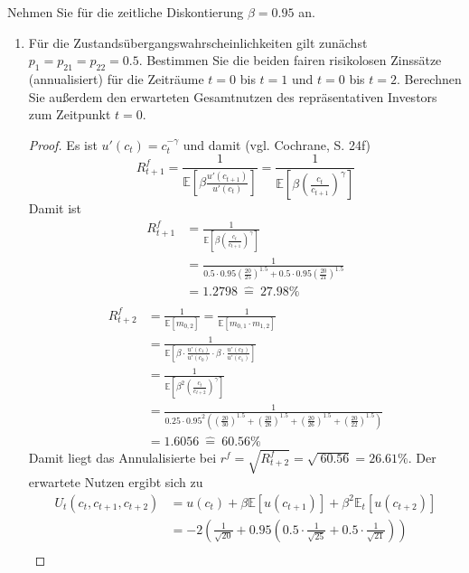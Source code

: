 \documentclass[12pt]{extreport} %
\theoremstyle{named}
\theoremstyle{nnamed}
\theoremstyle{itshape}
\theoremstyle{normal}
\begin{document}
Nehmen Sie für die zeitliche Diskontierung $\beta = 0.95$ an.
\begin{enumerate}
	\item Für die Zustandsübergangswahrscheinlichkeiten gilt zunächst $p_1 = p_{21} = p_{22} = 0.5$. Bestimmen Sie die beiden fairen risikolosen Zinssätze (annualisiert) für die Zeiträume $t = 0$ bis $t = 1$ und $t = 0$ bis $t = 2$. Berechnen Sie außerdem den erwarteten Gesamtnutzen des repräsentativen Investors zum Zeitpunkt $t = 0$.
		\begin{proof}
		Es ist $u'(c_t) = c_t^{-\gamma}$ und damit (vgl. Cochrane, S. 24f)
		$$ R_{t+1}^f = \frac{1}{\mathbb{E}\left[ \beta \frac{u'(c_{t+1})}{u'(c_t)} \right]} = \frac{1}{\mathbb{E}\left[ \beta \left( \frac{c_{t}}{c_{t+1}} \right)^\gamma \right]} $$
		Damit ist
			\begin{align*}
				R_{t+1}^f & = \frac{1}{\mathbb{E}\left[ \beta \left( \frac{c_{t}}{c_{t+1}} \right)^\gamma \right]} \\
				& =\frac{1}{0.5 \cdot 0.95  \left( \frac{20}{25} \right)^{1.5} + 0.5 \cdot 0.95  \left( \frac{20}{21} \right)^{1.5} } \\
				& = 1.2798 ~ \hat{=} ~ 27.98\% \\
			\end{align*}
			\begin{align*}
				R_{t+2}^f & = \frac{1}{\mathbb{E}[m_{0,2}]} = \frac{1}{\mathbb{E}[m_{0,1} \cdot m_{1,2}]}  \\
				& = \frac{1}{\mathbb{E}\left[\beta \cdot \frac{u'(c_1)}{u'(c_0)} \cdot \beta \cdot \frac{u'(c_2)}{u'(c_1)} \right]} \\
				& = \frac{1}{\mathbb{E}\left[ \beta^2 \left( \frac{c_{t}}{c_{t+2}} \right)^\gamma \right]} \\
			& =\frac{1}{0.25 \cdot 0.95^2 \left( \left( \frac{20}{30} \right)^{1.5} +  \left( \frac{20}{26} \right)^{1.5} + \left( \frac{20}{26} \right)^{1.5} + \left( \frac{20}{22} \right)^{1.5} \right)} \\
			& = 1.6056~ \hat{=} ~60.56\%
			\end{align*}
			Damit liegt das Annulalisierte bei $r^f = \sqrt{R_{t+2}^f} = \sqrt{~60.56} = 26.61\%$. Der erwartete Nutzen ergibt sich zu
			\begin{align*}
				U_t(c_t, c_{t+1}, c_{t+2}) & = u(c_t) + \beta \mathbb{E}[ u(c_{t+1})] + \beta^2 \mathbb{E}_t \left[ u(c_{t+2}) \right] \\
						& = -2 \left( \frac{1}{\sqrt{20}} + 0.95 \left( 0.5 \cdot \frac{1}{\sqrt{25}} + 0.5 \cdot \frac{1}{\sqrt{21}} \right)\right) \\

\end{align*}
\end{proof}
\end{enumerate}
\end{document}
